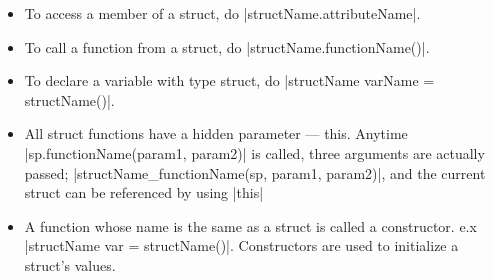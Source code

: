 \documentclass[12pt, letterpaper, oneside]{article}
\begin{document}
	\begin{itemize}
		\item[--] To access a member of a struct, do \spverb|structName.attributeName|.
		\item[--] To call a function from a struct, do \spverb|structName.functionName()|.
		\item[--] To declare a variable with type struct, do \newline \spverb|structName varName = structName()|.
		\item[--] All struct functions have a hidden parameter --- this. Anytime \newline \spverb|sp.functionName(param1, param2)| is called, three arguments are \newline actually passed; \spverb|structName_functionName(sp, param1, param2)|, and the current struct can be referenced by using \spverb|this|
		\item[--] A function whose name is the same as a struct is called a \newline constructor. e.x \spverb|structName var = structName()|. Constructors are used to initialize a struct's values.
		\newpage
		

\end{itemize}
\end{document}
